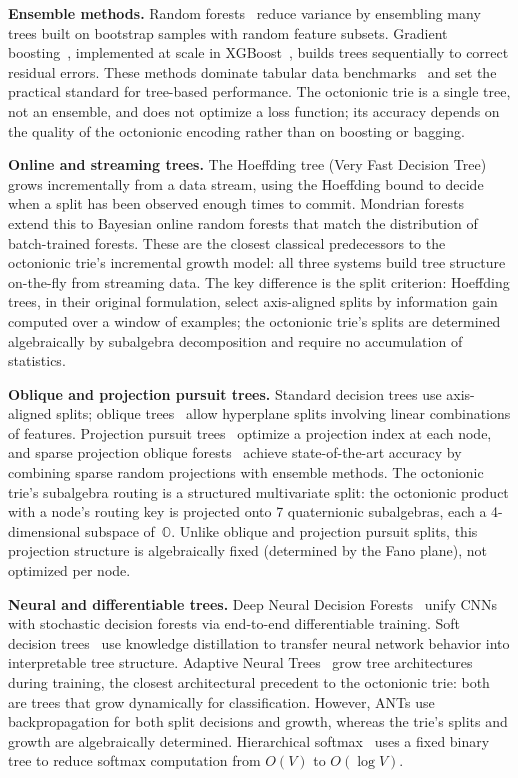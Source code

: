 \documentclass[11pt,a4paper]{article}
\theoremstyle{definition}
\theoremstyle{remark}
\newcommand{\Oct}{\mathbb{O}}
\begin{document}
\textbf{Ensemble methods.} Random forests~\citep{Breiman2001} reduce variance by ensembling many trees built on bootstrap samples with random feature subsets. Gradient boosting~\citep{Friedman2001}, implemented at scale in XGBoost~\citep{ChenGuestrin2016}, builds trees sequentially to correct residual errors. These methods dominate tabular data benchmarks~\citep{Grinsztajn2022} and set the practical standard for tree-based performance. The octonionic trie is a single tree, not an ensemble, and does not optimize a loss function; its accuracy depends on the quality of the octonionic encoding rather than on boosting or bagging.

\textbf{Online and streaming trees.} The Hoeffding tree (Very Fast Decision Tree)~\citep{Domingos2000} grows incrementally from a data stream, using the Hoeffding bound to decide when a split has been observed enough times to commit. Mondrian forests~\citep{Lakshminarayanan2014} extend this to Bayesian online random forests that match the distribution of batch-trained forests. These are the closest classical predecessors to the octonionic trie's incremental growth model: all three systems build tree structure on-the-fly from streaming data. The key difference is the split criterion: Hoeffding trees, in their original formulation, select axis-aligned splits by information gain computed over a window of examples; the octonionic trie's splits are determined algebraically by subalgebra decomposition and require no accumulation of statistics.

\textbf{Oblique and projection pursuit trees.} Standard decision trees use axis-aligned splits; oblique trees~\citep{Murthy1994} allow hyperplane splits involving linear combinations of features. Projection pursuit trees~\citep{Lee2013} optimize a projection index at each node, and sparse projection oblique forests~\citep{Tomita2020} achieve state-of-the-art accuracy by combining sparse random projections with ensemble methods. The octonionic trie's subalgebra routing is a structured multivariate split: the octonionic product with a node's routing key is projected onto 7 quaternionic subalgebras, each a 4-dimensional subspace of~$\Oct$. Unlike oblique and projection pursuit splits, this projection structure is algebraically fixed (determined by the Fano plane), not optimized per node.

\textbf{Neural and differentiable trees.} Deep Neural Decision Forests~\citep{Kontschieder2015} unify CNNs with stochastic decision forests via end-to-end differentiable training. Soft decision trees~\citep{Frosst2017} use knowledge distillation to transfer neural network behavior into interpretable tree structure. Adaptive Neural Trees~\citep{Tanno2019} grow tree architectures during training, the closest architectural precedent to the octonionic trie: both are trees that grow dynamically for classification. However, ANTs use backpropagation for both split decisions and growth, whereas the trie's splits and growth are algebraically determined. Hierarchical softmax~\citep{Morin2005} uses a fixed binary tree to reduce softmax computation from $O(V)$ to $O(\log V)$.
\end{document}
